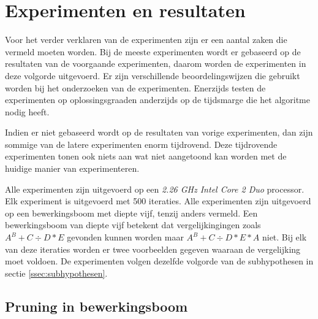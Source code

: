 \documentclass[Main.tex]{subfiles}
\begin{document}
\section{Experimenten en resultaten}
Voor het verder verklaren van de experimenten zijn er een aantal zaken die vermeld moeten worden. Bij de meeste experimenten wordt er gebaseerd op de resultaten van de voorgaande experimenten, daarom worden de experimenten in deze volgorde uitgevoerd. Er zijn verschillende beoordelingswijzen die gebruikt worden bij het onderzoeken van de experimenten. Enerzijds testen de experimenten op oplossingsgraad\footnotemark[\ref{note:oplossingsgraad}] en anderzijds op de tijdsmarge die het algoritme nodig heeft. \par Indien er niet gebaseerd wordt op de resultaten van vorige experimenten, dan zijn sommige van de latere experimenten enorm tijdrovend. Deze tijdrovende experimenten tonen ook niets aan wat niet aangetoond kan worden met de huidige manier van experimenteren. \par Alle experimenten zijn uitgevoerd op een \textit{2.26 GHz Intel Core 2 Duo} processor. Elk experiment is uitgevoerd met 500 iteraties. Alle experimenten zijn uitgevoerd op een bewerkingsboom met diepte vijf, tenzij anders vermeld. Een bewerkingsboom van diepte vijf betekent dat vergelijkingingen zoals $A^{B}+C \div D \ast E$ gevonden kunnen worden maar $A^{B}+C \div D \ast E \ast A$ niet. Bij elk van deze iteraties worden er twee voorbeelden gegeven waaraan de vergelijking moet voldoen. De experimenten volgen dezelfde volgorde van de subhypothesen in sectie \ref{ssec:subhypothesen}.  


\subsection{Pruning in bewerkingsboom} \label{ssec:pruning}
\end{document}

